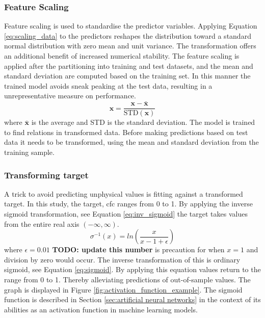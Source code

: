 
\subsubsection{Feature Scaling} \label{sec:scaling_predictors}
Feature scaling is used to standardise the predictor variables.
Applying Equation \eqref{eq:scaling_data} to the predictors reshapes the distribution toward a standard normal distribution with zero mean and unit variance. 
The transformation offers an additional benefit of increased numerical stability. %
The feature scaling is applied after the partitioning into training and test datasets, and the mean and standard deviation are computed based on the training set. In this manner the trained model avoids sneak peaking at the test data, resulting in a unrepresentative measure on performance.
\begin{equation} \label{eq:scaling_data}
    \mathbf{x} = \frac{\mathbf{x} - \bar{\mathbf{x}}}{\text{STD}(\mathbf{x})}
\end{equation}
where $\bar{\mathbf{x}}$ is the average and STD is the standard deviation. 
The model is trained to find relations in transformed data. Before making predictions based on test data it needs to be transformed, using the mean and standard deviation from the training sample.

\subsubsection{Transforming target} \label{sec:transforming_target}
A trick to avoid predicting unphysical values is fitting against a transformed target. In this study, the target, \acrfull{cfc} ranges from 0 to 1. By applying the inverse sigmoid transformation, see Equation \eqref{eq:inv_sigmoid} the target takes values from the entire real axis $(-\infty, \infty)$. 
\begin{equation} \label{eq:inv_sigmoid}
   \sigma^{-1} \left( x \right) = ln \left(\frac{x}{x - 1 + \epsilon} \right)
\end{equation}
where $\epsilon = 0.01$ \textbf{TODO: update this number} is precaution for when $x=1$ and division by zero would occur. 
The inverse transformation of this is ordinary sigmoid, see Equation \eqref{eq:sigmoid}. By applying this equation values return to the range from 0 to 1. Thereby alleviating predictions of out-of-sample values. The graph is displayed in Figure \ref{fig:activation_function_example}. The sigmoid function is described in Section \ref{sec:artificial neural networks} in the context of its abilities as an activation function in machine learning models. 

